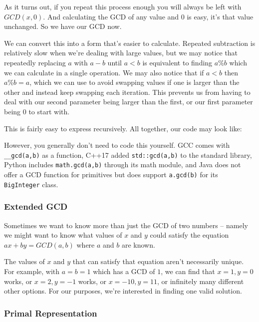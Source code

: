 As it turns out, if you repeat this process enough you will always be left with $GCD(x, 0)$. And calculating the GCD of any value and $0$ is easy, it's that value unchanged. So we have our GCD now.

We can convert this into a form that's easier to calculate. Repeated subtraction is relatively slow when we're dealing with large values, but we may notice that repeatedly replacing $a$ with $a - b$ until $a < b$ is equivalent to finding $a \% b$ which we can calculate in a single operation. We may also notice that if $a < b$ then $a \% b = a$, which we can use to avoid swapping values if one is larger than the other and instead keep swapping each iteration. This prevents us from having to deal with our second parameter being larger than the first, or our first parameter being 0 to start with. 

This is fairly easy to express recursively. All together, our code may look like:


However, you generally don't need to code this yourself. GCC comes with \texttt{__gcd(a,b)} as a function, C++17 added \texttt{std::gcd(a,b)} to the standard library, Python includes \texttt{math.gcd(a,b)} through its math module, and Java does not offer a GCD function for primitives but does support \texttt{a.gcd(b)} for its \texttt{BigInteger} class.

\subsubsection{Extended GCD}
 

Sometimes we want to know more than just the GCD of two numbers -- namely we might want to know what values of $x$ and $y$ could satisfy the equation $ax + by = GCD(a,b)$ where $a$ and $b$ are known.

The values of $x$ and $y$ that can satisfy that equation aren't necessarily unique. For example, with $a = b = 1$ which has a GCD of $1$, we can find that $x = 1, y = 0$ works, or $x = 2, y = -1$ works, or $x = -10, y = 11$, or infinitely many different other options. For our purposes, we're interested in finding one valid solution.


\subsubsection{Primal Representation}

